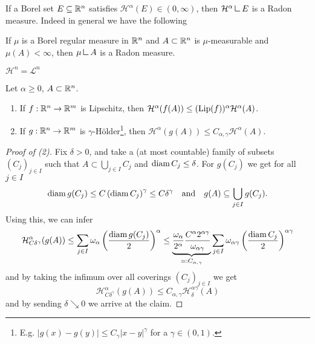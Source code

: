 If a Borel set $E \subseteq \mathbb{R}^n$ satisfies $\mathcal{H}^\alpha(E) \in
(0,\infty)$, then $\mathcal{H}^\alpha \mres E$ is a Radon measure. Indeed in
general we have the following

\begin{theorem}
If $\mu$ is a Borel regular measure in $\mathbb{R}^n$ and $A \subset \mathbb{R}^n$ is
$\mu$-measurable and $\mu(A) < \infty$, then $\mu \mres A$ is a Radon measure. 
\end{theorem}

\begin{theorem}
$\mathcal{H}^n = \mathcal{L}^n$
\end{theorem}

\begin{proposition}
Let $\alpha \geq 0$, $A \subset \mathbb{R}^n$.
\begin{enumerate}[(1)]
\item If $f : \mathbb{R}^n \to \mathbb{R}^m$ is Lipschitz, then $\mathcal{H}^\alpha(f(A)) \leq
(\operatorname{Lip}(f))^\alpha \mathcal{H}^\alpha(A)$.
\item If $g : \mathbb{R}^n \to \mathbb{R}^m$ is $\gamma$-Hölder\footnote{E.g. $|g(x) - g(y)| \leq
C_\gamma |x-y|^\gamma$ for a $\gamma \in (0,1)$.}, then $\mathcal{H}^\alpha(g(A)) \leq
C_{\alpha,\gamma} \mathcal{H}^\alpha(A)$.
\end{enumerate}
\end{proposition}

\begin{proof}[Proof of (2)]
Fix $\delta > 0$, and take a (at most countable) family of subsets $(C_j)_{j\in I}$
such that $ A \subset \bigcup_{j\in I} C_j$ and $\operatorname{diam} C_j \leq \delta$.
For $g(C_j)$ we get for all $j\in I$
\[
\begin{aligned}
\operatorname{diam} g(C_j)\leq C \left(\operatorname{diam} C_j\right)^\gamma \leq C \delta^\gamma
\quad \text{and} \quad
g(A) \subseteq \bigcup_{j\in I} g(C_j).
\end{aligned}
\]
Using this, we can infer
\[
\begin{aligned}
\mathcal{H}^\alpha_{C \delta^\gamma}(g(A)) \leq \sum_{j\in I} \omega_\alpha
\left(\frac{\operatorname{diam} g(C_j)}{2}\right)^\alpha
\leq 
\underbrace{\frac{\omega_\alpha}{2^\alpha} \frac{C^\alpha
2^{\alpha\gamma}}{\omega_{\alpha\gamma}}}_{=: C_{\alpha,\gamma}} \sum_{j\in I} \omega_{\alpha \gamma} 
\left(\frac{\operatorname{diam} C_j}{2}\right)^{\alpha\gamma}
\end{aligned}
\]
and by taking the infimum over all coverings $(C_j)_{j\in I}$ we get
\[
\mathcal{H}^\alpha_{C\delta^\gamma} (g(A)) \leq C_{\alpha,\gamma}
\mathcal{H}^{\alpha\gamma}_\delta (A)
\]
and by sending $\delta \searrow 0 $ we arrive at the claim.
\end{proof}

